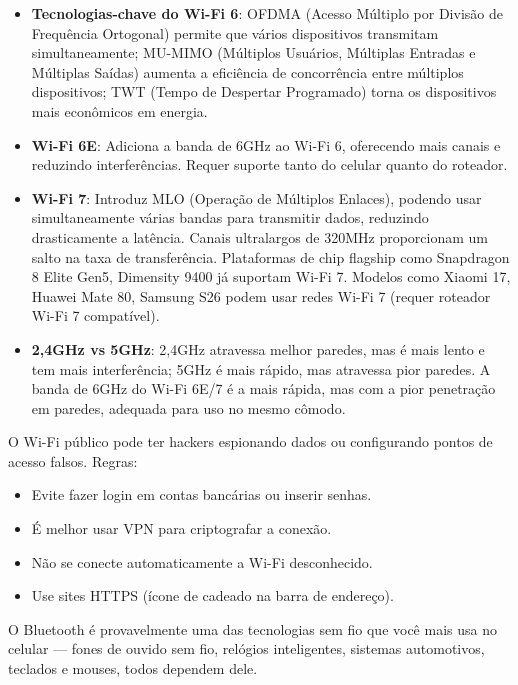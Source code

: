 \begin{itemize}
  \item \textbf{Tecnologias-chave do Wi-Fi 6}: OFDMA (Acesso Múltiplo por Divisão de Frequência Ortogonal) permite que vários dispositivos transmitam simultaneamente; MU-MIMO (Múltiplos Usuários, Múltiplas Entradas e Múltiplas Saídas) aumenta a eficiência de concorrência entre múltiplos dispositivos; TWT (Tempo de Despertar Programado) torna os dispositivos mais econômicos em energia.
  \item \textbf{Wi-Fi 6E}: Adiciona a banda de 6GHz ao Wi-Fi 6, oferecendo mais canais e reduzindo interferências. Requer suporte tanto do celular quanto do roteador.
  \item \textbf{Wi-Fi 7}: Introduz MLO (Operação de Múltiplos Enlaces), podendo usar simultaneamente várias bandas para transmitir dados, reduzindo drasticamente a latência. Canais ultralargos de 320MHz proporcionam um salto na taxa de transferência. Plataformas de chip flagship como Snapdragon 8 Elite Gen5, Dimensity 9400 já suportam Wi-Fi 7. Modelos como Xiaomi 17, Huawei Mate 80, Samsung S26 podem usar redes Wi-Fi 7 (requer roteador Wi-Fi 7 compatível).
  \item \textbf{2,4GHz vs 5GHz}: 2,4GHz atravessa melhor paredes, mas é mais lento e tem mais interferência; 5GHz é mais rápido, mas atravessa pior paredes. A banda de 6GHz do Wi-Fi 6E/7 é a mais rápida, mas com a pior penetração em paredes, adequada para uso no mesmo cômodo.
\end{itemize}


O Wi-Fi público pode ter hackers espionando dados ou configurando pontos de acesso falsos. Regras:

\begin{itemize}
  \item Evite fazer login em contas bancárias ou inserir senhas.
  \item É melhor usar VPN para criptografar a conexão.
  \item Não se conecte automaticamente a Wi-Fi desconhecido.
  \item Use sites HTTPS (ícone de cadeado na barra de endereço).
\end{itemize}


O Bluetooth é provavelmente uma das tecnologias sem fio que você mais usa no celular — fones de ouvido sem fio, relógios inteligentes, sistemas automotivos, teclados e mouses, todos dependem dele.

